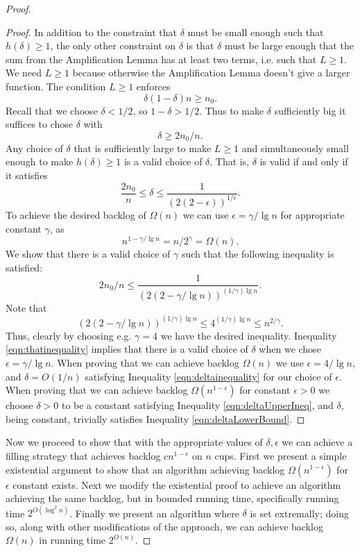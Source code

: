 \documentclass[twocolumn]{article}[10pt]
\begin{document}
\begin{proof}
\begin{proof}
  In addition to the constraint that $\delta$ must be small enough such that
  $h(\delta) \ge 1$, the only other constraint on $\delta$ is that $\delta$
  must be large enough that the sum from the Amplification Lemma has at least
  two terms, i.e. such that $L \ge 1$. We need $L\ge 1$ because otherwise the
  Amplification Lemma doesn't give a larger function.
  The condition $L \ge 1$ enforces 
  $$\delta(1-\delta)n \ge n_0. $$
  Recall that we choose $\delta < 1/2$, so $1-\delta > 1/2$. Thus to make
  $\delta$ sufficiently big it suffices to chose $\delta$ with 
  \begin{equation}
    \label{eqn:deltaLowerBound}
    \delta \ge 2n_0/n.
  \end{equation}
  Any choice of $\delta$ that is sufficiently large to make $L \ge 1$ and
  simultaneously small enough to make $h(\delta) \ge 1$ is a valid choice of
  $\delta$. That is, $\delta$ is valid if and only if it satisfies
  \begin{equation}
    \label{eqn:deltainequality}
    \frac{2n_0}{n} \le \delta \le  \frac{1}{(2(2-\epsilon))^{1/\epsilon}}.
  \end{equation}
  To achieve the desired backlog of $\Omega(n)$ we can use $\epsilon =
  \gamma/\lg n$ for appropriate constant $\gamma$, as $$n^{1-\gamma/\lg n} =
  n/2^\gamma = \Omega(n).$$
  We show that there is a valid choice of $\gamma$ such that the following inequality is satisfied:
  \begin{equation}
    \label{eqn:thatinequality}
   2n_0/n \le \frac{1}{(2(2-\gamma/\lg n))^{(1/\gamma)\lg n}}.
  \end{equation}
  Note that 
  $$(2(2-\gamma/\lg n))^{(1/\gamma)\lg n} \le 4^{(1/\gamma)\lg n} \le n^{2/\gamma}.$$
  Thus, clearly by choosing e.g. $\gamma = 4$ we have the desired inequality.
  Inequality \ref{eqn:thatinequality} implies that there is a valid choice of
  $\delta$ when we chose $\epsilon = \gamma / \lg n$. When proving that we can
  achieve backlog $\Omega(n)$ we use $\epsilon = 4 / \lg n$, and $\delta =
  O(1/n)$ satisfying Inequality \ref{eqn:deltainequality} for our choice
  of $\epsilon$. When proving that we can achieve backlog
  $\Omega(n^{1-\epsilon})$ for constant $\epsilon > 0$ we choose $\delta > 0$ to be
  a constant satisfying Inequality \ref{eqn:deltaUpperIneq}, and $\delta$,
  being constant, trivially satisfies Inequality \ref{eqn:deltaLowerBound}.
    
  \end{proof}

  Now we proceed to show that with the appropriate values of $\delta, \epsilon$ we
  can achieve a filling strategy that achieves backlog $cn^{1-\epsilon}$ on $n$ cups.
  First we present a simple existential argument to show that an algorithm
  achieving backlog $\Omega(n^{1-\epsilon})$ for $\epsilon$ constant exists. Next we modify the
  existential proof to achieve an algorithm achieving the same backlog, but in
  bounded running time, specifically running time $2^{O(\log^2 n)}$.
  Finally we present an algorithm where $\delta$ is set extremally; doing so,
  along with other modifications of the approach, we can achieve backlog
  $\Omega(n)$ in running time $2^{O(n)}$.
  

\end{proof}
\end{document}
